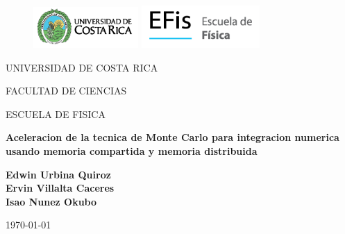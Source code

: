 \documentclass[11 pt]{article}
\begin{document}
\begin{titlepage}
   \begin{figure}[ht]
			\includegraphics[width=4cm]{UCR1.png}
	   \endminipage
			\includegraphics[width=4.5cm]{EFis1.png}
		\endminipage
\end{figure}
	
	\begin{center}
	\vspace{0.8cm}
	{\huge	UNIVERSIDAD DE COSTA RICA}
	
	\vspace{1cm}
	{\huge FACULTAD DE CIENCIAS}

    \vspace{0.8cm}
	{\huge ESCUELA DE FISICA}
	
	\vspace{3cm}	
	\LARGE
	\textbf{Aceleracion de la tecnica de Monte Carlo para
integracion numerica usando memoria compartida y
memoria distribuida}

	\vspace{3cm}
	\large
	\textbf{Edwin Urbina Quiroz \\
    Ervin Villalta Caceres\\
    Isao Nunez Okubo}
	
	
	
	\vspace{1.3cm}
	{\large \today}
	\end{center}
\end{titlepage}


\end{document}
